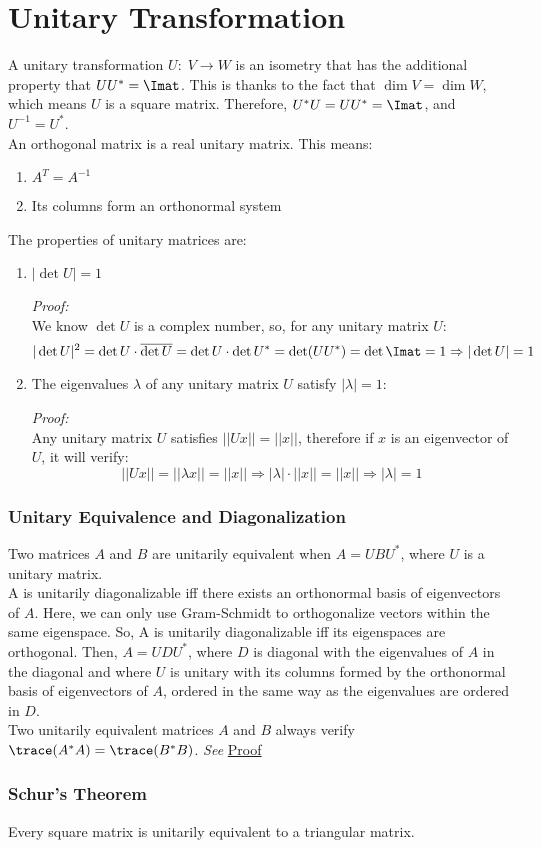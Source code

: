 \section*{Unitary Transformation}

A unitary transformation $U:\;V \rightarrow W$ is an isometry that has the additional property that $UU^*=\Imat$. This is thanks to the fact that $\dim V=\dim W$, which means $U$ is a square matrix. Therefore,  $U^*U=UU^*=\Imat$, and $U^{-1}=U^*$.\\

An orthogonal matrix is a real unitary matrix. This means:
\begin{enumerate}[label=(\roman*)]
    \item $A^T=A^{-1}$
    \item Its columns form an orthonormal system
\end{enumerate}

The properties of unitary matrices are: 
\begin{enumerate}[label=(\roman*)]
    \item $|\det U|=1$
    
    \textit{Proof:}\\
    We know $\det U$ is a complex number, so, for any unitary matrix $U$:
    $$|\det U|^2=\det U\cdot\overline{\det U}=\det U\cdot\det U^*=\det (UU^*)=\det \Imat=1\Rightarrow |\det U|=1$$
    
    \item The eigenvalues $\lambda$ of any unitary matrix $U$ satisfy $|\lambda|=1$:
    
    \textit{Proof:}\\
    Any unitary matrix $U$ satisfies $||Ux||=||x||$, therefore if $x$ is an eigenvector of $U$, it will verify:
    $$||Ux||=||\lambda x||=||x||\Rightarrow |\lambda|\cdot|| x||=||x||\Rightarrow |\lambda|=1$$
\end{enumerate}

\subsubsection*{Unitary Equivalence and Diagonalization}

Two matrices $A$ and $B$ are unitarily equivalent when $A=UBU^*$, where $U$ is a unitary matrix.\\

A is unitarily diagonalizable iff there exists an orthonormal basis of eigenvectors of $A$. Here, we can only use Gram-Schmidt to orthogonalize vectors within the same eigenspace. So, A is unitarily diagonalizable iff its eigenspaces are orthogonal. Then, $A=UDU^*$, where $D$ is diagonal with the eigenvalues of $A$ in the diagonal and where $U$ is unitary with its columns formed by the orthonormal basis of eigenvectors of $A$, ordered in the same way as the eigenvalues are ordered in $D$.\\

Two unitarily equivalent matrices $A$ and $B$ always verify $\trace(A^*A)=\trace(B^*B)$. \textit{See} \hyperref[sec:unittrace]{Proof}

\subsubsection*{Schur's Theorem}
Every square matrix is unitarily equivalent to a triangular matrix.